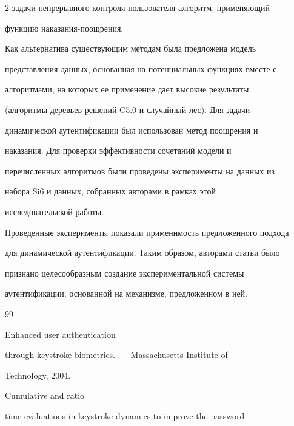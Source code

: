 \begin{multicols}{2}
задачи непрерывного контроля пользователя алгоритм, применяющий

функцию на\-ка\-за\-ния-по\-ощре\-ния.



Как альтернатива существующим методам была предложена модель

представления данных, основанная на потенциальных функциях вместе с

алгоритмами, на которых ее применение дает высокие результаты

(алгоритмы деревьев решений C5.0 и случайный лес). Для задачи

динамической аутентификации был использован метод поощрения и

наказания. Для проверки эффективности сочетаний модели и

перечисленных алгоритмов были проведены эксперименты на данных из

набора Si6 и данных, собранных авторами в рамках этой

исследовательской работы.



Проведенные эксперименты показали применимость предложенного подхода

для динамической аутентификации. Таким образом, авторами статьи было

признано целесообразным создание экспериментальной системы

аутентификации, основанной на механизме, предложенном в ней.



{\small\frenchspacing

{%


\begin{thebibliography}{99}








 Enhanced user authentication

through keystroke biometrics.~--- Massachusetts Institute of

Technology, 2004.




 Cumulative and ratio

time evaluations in keystroke dynamics to improve the password


\end{thebibliography}}}
\end{multicols}
